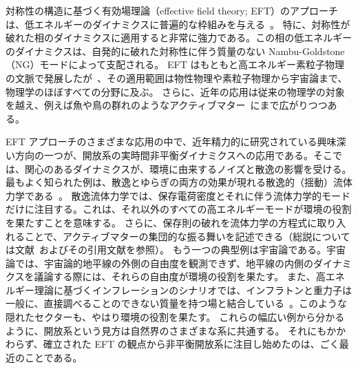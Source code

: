 
対称性の構造に基づく有効場理論（effective field theory; EFT）のアプローチは、低エネルギーのダイナミクスに普遍的な枠組みを与える~\cite{Manohar:1996cq}。
特に、対称性が破れた相のダイナミクスに適用すると非常に強力である。この相の低エネルギーのダイナミクスは、自発的に破れた対称性に伴う質量のない Nambu-Goldstone（NG）モードによって支配される。
EFT はもともと高エネルギー素粒子物理の文脈で発展したが~\cite{Coleman:1969sm,Callan:1969sn,Weinberg:1978kz}、その適用範囲は物性物理や素粒子物理から宇宙論まで、物理学のほぼすべての分野に及ぶ。
さらに、近年の応用は従来の物理学の対象を越え、例えば魚や鳥の群れのようなアクティブマター~\cite{TonerTu1,TonerTu2}にまで広がりつつある。



\medskip
EFT アプローチのさまざまな応用の中で、近年精力的に研究されている興味深い方向の一つが、開放系の実時間非平衡ダイナミクスへの応用である。そこでは、関心のあるダイナミクスが、環境に由来するノイズと散逸の影響を受ける。
最もよく知られた例は、散逸とゆらぎの両方の効果が現れる散逸的（揺動）流体力学である~\cite{Grozdanov:2013dba,Haehl:2015uoc,Crossley:2015evo,Glorioso:2017fpd,Jensen:2017kzi,Haehl:2018lcu,Jensen:2018hse}。
散逸流体力学では、保存電荷密度とそれに伴う流体力学的モードだけに注目する。これは、それ以外のすべての高エネルギーモードが環境の役割を果たすことを意味する。
さらに、保存則の破れを流体力学の方程式に取り入れることで、アクティブマターの集団的な振る舞いを記述できる（総説については文献~\cite{RevModPhys.85.1143}およびその引用文献を参照）。
もう一つの典型例は宇宙論である。宇宙論では、宇宙論的地平線の外側の自由度を観測できず、地平線の内側のダイナミクスを議論する際には、それらの自由度が環境の役割を果たす。
また、高エネルギー理論に基づくインフレーションのシナリオでは、インフラトンと重力子は一般に、直接調べることのできない質量を持つ場と結合している~\cite{Chen:2009zp,Baumann:2011nk,Noumi:2012vr,Arkani-Hamed:2015bza}。このような隠れたセクターも、やはり環境の役割を果たす。
これらの幅広い例から分かるように、開放系という見方は自然界のさまざまな系に共通する。
それにもかかわらず、確立された EFT の観点から非平衡開放系に注目し始めたのは、ごく最近のことである。

